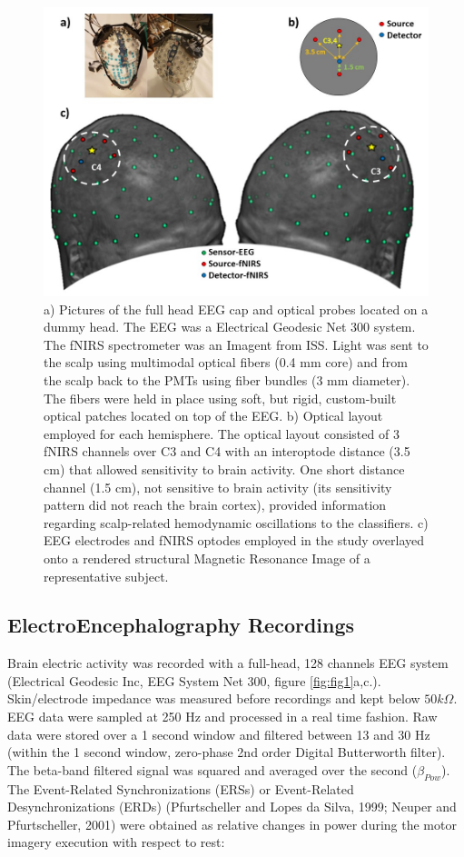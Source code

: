 \documentclass[12pt]{iopart}
\begin{document}
\begin{figure}
	\includegraphics[width=\linewidth]{Slide2.JPG}
	\caption{a) Pictures of the full head EEG cap and optical probes located on a dummy head. The EEG was a Electrical Geodesic Net 300 system. The fNIRS spectrometer was an Imagent from ISS. Light was sent to the scalp using multimodal optical fibers (0.4 mm core) and from the scalp back to the PMTs using fiber bundles (3 mm diameter).  The fibers were held in place using soft, but rigid, custom-built optical patches located on top of the EEG. b) Optical layout employed for each hemisphere. The optical layout consisted of 3 fNIRS channels over C3 and C4 with an interoptode distance (3.5 cm) that allowed sensitivity to brain activity. One short distance channel (1.5 cm),  not sensitive to brain activity (its sensitivity pattern did not reach the brain cortex), provided information regarding scalp-related hemodynamic oscillations to the classifiers. c) EEG electrodes and fNIRS optodes employed in the study overlayed onto a rendered structural Magnetic Resonance Image of a representative subject. }
	\label{fig:fig2}
\end{figure}


\subsection{ElectroEncephalography Recordings}
Brain electric activity was recorded with a full-head, 128 channels EEG system (Electrical Geodesic Inc, EEG System Net 300, figure \ref{fig:fig1}a,c.).
Skin/electrode impedance was measured before recordings and kept below $50 k\Omega$. EEG data were sampled at 250 Hz and processed in a real time fashion.  Raw data were stored over a 1 second window and filtered between 13 and 30 Hz (within the 1 second window, zero-phase 2nd order Digital Butterworth filter). The beta-band filtered signal was squared and averaged over the second ($\beta_{Pow}$).
 The Event-Related Synchronizations (ERSs) or Event-Related Desynchronizations (ERDs) (Pfurtscheller and Lopes da Silva, 1999; Neuper and Pfurtscheller, 2001) were obtained as relative changes in power during the motor imagery execution with respect to rest:
\end{document}
